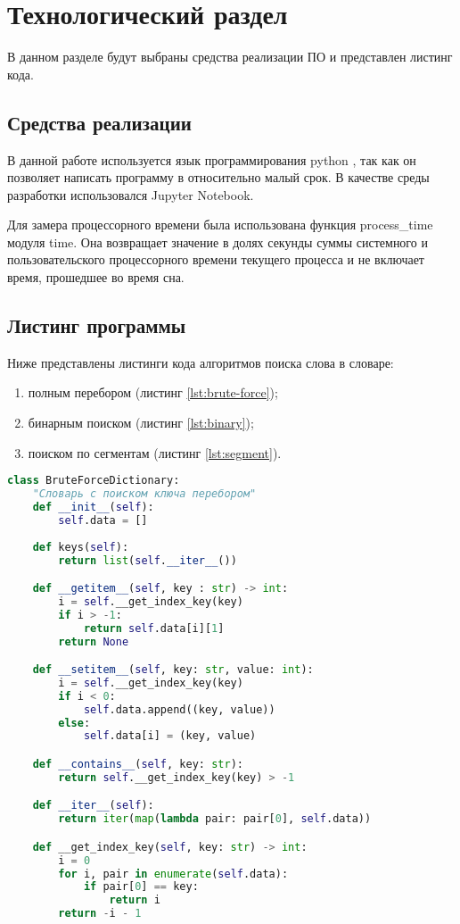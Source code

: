 \chapter{ Технологический раздел}
\label{cha:technological}

    В данном разделе будут выбраны средства реализации ПО и представлен листинг кода. 

    \section{Средства реализации}
        В данной работе используется язык программирования python \cite{c-sharp}, так как
        он позволяет написать программу в относительно малый срок.
        В качестве среды разработки использовался Jupyter Notebook.

        Для замера процессорного времени была использована функция process\_time модуля time.
        Она возвращает значение в долях секунды суммы системного и пользовательского процессорного времени текущего процесса и 
        не включает время, прошедшее во время сна.

    \section{Листинг программы}
        Ниже представлены листинги кода алгоритмов поиска слова в словаре:
        \begin{enumerate}
            \item полным перебором (листинг \ref{lst:brute-force});
            \item бинарным поиском (листинг \ref{lst:binary});
            \item поиском по сегментам (листинг \ref{lst:segment}).
        \end{enumerate}
        
        \begin{lstlisting}[language=python, label=lst:brute-force, caption=Реализация алгоритма поиска слов в словаре полным перебором]
class BruteForceDictionary:
    "Словарь с поиском ключа перебором"
    def __init__(self):
        self.data = []
    
    def keys(self):
        return list(self.__iter__())

    def __getitem__(self, key : str) -> int:
        i = self.__get_index_key(key)
        if i > -1:
            return self.data[i][1]
        return None

    def __setitem__(self, key: str, value: int):
        i = self.__get_index_key(key)
        if i < 0:
            self.data.append((key, value))
        else:
            self.data[i] = (key, value)

    def __contains__(self, key: str):
        return self.__get_index_key(key) > -1

    def __iter__(self):
        return iter(map(lambda pair: pair[0], self.data))

    def __get_index_key(self, key: str) -> int:
        i = 0
        for i, pair in enumerate(self.data):
            if pair[0] == key:
                return i
        return -i - 1
        \end{lstlisting}

